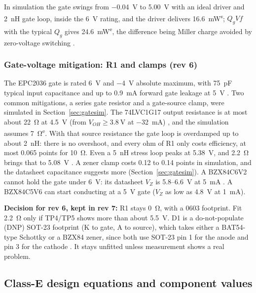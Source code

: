 \documentclass[11pt,letterpaper]{article}
\newcommand{\est}{\textsuperscript{e}}
\newcommand{\simv}{\textsuperscript{s}}
\begin{document}
In simulation the gate swings from \SI{-0.04}{\volt} to \SI{5.00}{\volt} with an ideal driver and \SI{2}{\nano\henry} gate loop, inside the \SI{6}{\volt} rating, and the driver delivers \SI{16.6}{\milli\watt}\simv{}; $Q_g V f$ with the typical $Q_g$ gives \SI{24.6}{\milli\watt}\est, the difference being Miller charge avoided by zero-voltage switching \cite{projsim,projnotes}.

\subsubsection*{Gate-voltage mitigation: R1 and clamps (rev 6)}
The EPC2036 gate is rated \SI{6}{\volt} and \SI{-4}{\volt} absolute maximum, with \SI{75}{\pico\farad} typical input capacitance and up to \SI{0.9}{\milli\ampere} forward gate leakage at \SI{5}{\volt} \cite{epc2036ds}. Two common mitigations, a series gate resistor and a gate-source clamp, were simulated in Section~\ref{sec:gatesim}. The 74LVC1G17 output resistance is at most about \SI{22}{\ohm} at \SI{4.5}{\volt} (from $V_{OH}\ge\SI{3.8}{\volt}$ at \SI{-32}{\milli\ampere}) \cite{tiLVC1G17}, and the simulation assumes \SI{7}{\ohm}\est. With that source resistance the gate loop is overdamped up to about \SI{2}{\nano\henry}: there is no overshoot, and every ohm of R1 only costs efficiency, at most 0.065 points for \SI{10}{\ohm}. Even a \SI{5}{\nano\henry} stress loop peaks at \SI{5.38}{\volt}, and \SI{2.2}{\ohm} brings that to \SI{5.08}{\volt} \cite{projsim}. A zener clamp costs 0.12 to 0.14 points in simulation, and the datasheet capacitance suggests more (Section~\ref{sec:gatesim}). A BZX84C6V2 cannot hold the gate under \SI{6}{\volt}: its datasheet $V_Z$ is 5.8--\SI{6.6}{\volt} at \SI{5}{\milli\ampere} \cite{onsemiBZX84}. A BZX84C5V6 can start conducting at a \SI{5}{\volt} gate ($V_Z$ as low as \SI{4.8}{\volt} at \SI{1}{\milli\ampere}).

\textbf{Decision for rev 6, kept in rev 7:} R1 stays \SI{0}{\ohm}, with a 0603 footprint. Fit \SI{2.2}{\ohm} only if TP4/TP5 shows more than about \SI{5.5}{\volt}. D1 is a do-not-populate (DNP) SOT-23 footprint (K to gate, A to source), which takes either a BAT54-type Schottky or a BZX84 zener, since both use SOT-23 pin 1 for the anode and pin 3 for the cathode \cite{onsemiBAT54,onsemiBZX84}. It stays unfitted unless measurement shows a real problem.

\subsection{Class-E design equations and component values}\label{sec:sokal}
\end{document}
